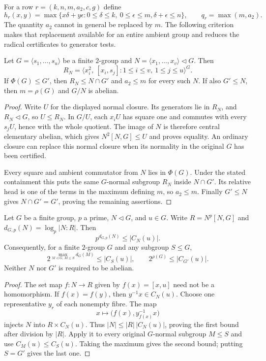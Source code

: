 For a row $r=(k,n,m,a_2,c,g)$ define
\[
 h_r(x,y)=\max\{x\delta+y\epsilon:
       0\leq\delta\leq k,\ 0\leq\epsilon\leq m,
       \delta+\epsilon\leq n\},\qquad q_r=\max(m,a_2).
\]
The quantity $a_2$ cannot in general be replaced by $m$.
The following criterion makes that replacement available for an entire
ambient group and reduces the radical certificates to generator tests.

\begin{lemma}\label{lem:carrier-finite-radical}
Let $G=\langle s_1,\ldots,s_u\rangle$ be a finite $2$-group and
$N=\langle x_1,\ldots,x_v\rangle\lhd G$. Then
\[
 R_N=\bigl\langle x_i^2,\ [x_i,s_j]:
       1\leq i\leq v,\ 1\leq j\leq u\bigr\rangle^G.
\]
If $\Phi(G)\leq G'$, then $R_N\leq N\cap G'$ and $a_2\leq m$
for every such $N$. If also $G'\leq N$, then $m=\rho(G)$ and
$G/N$ is abelian.
\end{lemma}
\begin{proof}
Write $U$ for the displayed normal closure. Its generators lie in
$R_N$, and $R_N\lhd G$, so $U\leq R_N$. In $G/U$, each $x_iU$
has square one and commutes with every $s_jU$, hence with the whole
quotient. The image of $N$ is therefore central elementary abelian,
which gives $N^2[N,G]\leq U$ and proves equality. An ordinary closure
can replace this normal closure when its normality in the original
$G$ has been certified.

Every square and ambient commutator from $N$ lies in $\Phi(G)$.
Under the stated containment this puts the same $G$-normal subgroup
$R_N$ inside $N\cap G'$. Its relative head is one of the terms in
the maximum defining $m$, so $a_2\leq m$. Finally $G'\leq N$ gives
$N\cap G'=G'$, proving the remaining assertions.
\end{proof}

\begin{lemma}
\label{lem:carrier-centralizer-head}
Let $G$ be a finite group, $p$ a prime, $N\lhd G$, and $u\in G$.
Write $R=N^p[N,G]$ and $d_{G,p}(N)=\log_p|N:R|$. Then
\[
 p^{d_{G,p}(N)}\leq |C_N(u)|.
\]
Consequently, for a finite $2$-group $G$ and any subgroup $S\leq G$,
\[
 2^{\max_{M\lhd G,\,M\leq S}d_G(M)}\leq |C_S(u)|,
 \qquad 2^{\rho(G)}\leq |C_{G'}(u)|.
\]
Neither $N$ nor $G'$ is required to be abelian.
\end{lemma}
\begin{proof}
The set map $f:N\to R$ given by $f(x)=[x,u]$ need not be a
homomorphism. If $f(x)=f(y)$, then $y^{-1}x\in C_N(u)$.
Choose one representative $y_r$ of each nonempty fibre. The map
\[
 x\longmapsto \bigl(f(x),y_{f(x)}^{-1}x\bigr)
\]
injects $N$ into $R\times C_N(u)$. Thus
$|N|\leq |R|\,|C_N(u)|$, proving the first bound after division
by $|R|$. Apply it to every original $G$-normal subgroup $M\leq S$
and use $C_M(u)\leq C_S(u)$. Taking the maximum gives the second
bound; putting $S=G'$ gives the last one.
\end{proof}

